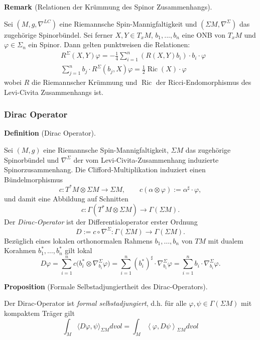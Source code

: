 \documentclass[10pt, letterpaper]{article}
\newcommand{\CustomHeading}[3]{%
  \par\medskip\noindent%
  \textbf{#1 #2} \textnormal{(#3)}.\enskip%
}
\newenvironment{DEF}[2]{\CustomHeading{Definition}{#1}{#2}}{}
\newenvironment{PROP}[2]{\CustomHeading{Proposition}{#1}{#2}}{}
\newenvironment{REM}[2]{\CustomHeading{Remark}{#1}{#2}}{}
\begin{document}
\begin{REM}{\parencite[p.~104,108]{BaerSpin}}{Relationen der Krümmung des Spinor Zusammenhangs}
  Sei $(M,g,\nabla^{LC})$ eine Riemannsche Spin-Mannigfaltigkeit und $(\Sigma M,\nabla^\Sigma)$ das zugehörige Spinorbündel. Sei ferner $X,Y\in T_x M$, $b_1,...,b_n$ eine ONB von $T_xM$ und $\varphi\in \Sigma_n$ ein Spinor. Dann gelten punktweisen die Relationen:
  $$
  \begin{aligned}
    &R^{\Sigma}(X, Y) \varphi =-\frac{1}{4} \sum_{i=1}^n\left(R(X, Y) b_i\right) \cdot b_i \cdot \varphi\\
    &\sum_{j=1}^n b_j \cdot R^{\Sigma}\left(b_j, X\right) \varphi=\frac{1}{2} \operatorname{Ric}(X) \cdot \varphi
  \end{aligned}
  $$
  wobei $R$ die Riemannscher Krümmung und $\operatorname{Ric}$ der Ricci-Endomorphismus des Levi-Civita Zusammenhangs ist. 
\end{REM}



\subsubsection{Dirac Operator}


\begin{DEF}{}{Dirac Operator}
Sei $(M,g)$ eine Riemannsche Spin-Mannigfaltigkeit, $\Sigma M$ das zugehörige
Spinorbündel und $\nabla^\Sigma$ der vom Levi-Civita-Zusammenhang induzierte
Spinorzusammenhang. Die Clifford-Multiplikation induziert einen Bündelmorphismus
\[
c:T^*M\otimes \Sigma M\to \Sigma M,\qquad c(\alpha\otimes \varphi):=\alpha^\sharp\cdot\varphi,
\]
und damit eine Abbildung auf Schnitten
\[
c:\Gamma(T^*M\otimes \Sigma M)\to \Gamma(\Sigma M).
\]
Der \emph{Dirac-Operator} ist der Differentialoperator erster Ordnung
\[
D:=c\circ \nabla^\Sigma:\Gamma(\Sigma M)\to \Gamma(\Sigma M).
\]
Bezüglich eines lokalen orthonormalen Rahmens $b_1,\dots,b_n$ von $TM$ mit dualem
Korahmen $b_1^*,\dots,b_n^*$ gilt lokal
\[
D\varphi
=
\sum_{i=1}^n c\bigl(b_i^*\otimes \nabla^\Sigma_{b_i}\varphi\bigr)
=
\sum_{i=1}^n (b_i^*)^\sharp\cdot \nabla^\Sigma_{b_i}\varphi
=
\sum_{i=1}^n b_i\cdot \nabla^\Sigma_{b_i}\varphi.
\]
\end{DEF}


\begin{PROP}{}{Formale Selbstadjungiertheit des Dirac-Operators} 
  Der Dirac-Operator ist \emph{formal selbstadjungiert}, d.h. für alle $\varphi,\psi \in \Gamma(\Sigma M)$ mit kompaktem Träger gilt
  $$
  \int_M\langle D \varphi, \psi\rangle_{\Sigma M} dvol = \int_M\left\langle \varphi, D \psi\right\rangle_{\Sigma M} dvol
  $$
\end{PROP}
\end{document}
